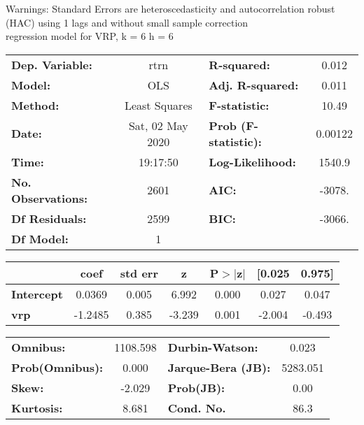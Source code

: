 Warnings: \newline
 [1] Standard Errors are heteroscedasticity and autocorrelation robust (HAC) using 1 lags and without small sample correction\\ 

regression model for VRP, k = 6 h = 6\begin{center}
\begin{tabular}{lclc}
\toprule
\textbf{Dep. Variable:}    &       rtrn       & \textbf{  R-squared:         } &     0.012   \\
\textbf{Model:}            &       OLS        & \textbf{  Adj. R-squared:    } &     0.011   \\
\textbf{Method:}           &  Least Squares   & \textbf{  F-statistic:       } &     10.49   \\
\textbf{Date:}             & Sat, 02 May 2020 & \textbf{  Prob (F-statistic):} &  0.00122    \\
\textbf{Time:}             &     19:17:50     & \textbf{  Log-Likelihood:    } &    1540.9   \\
\textbf{No. Observations:} &        2601      & \textbf{  AIC:               } &    -3078.   \\
\textbf{Df Residuals:}     &        2599      & \textbf{  BIC:               } &    -3066.   \\
\textbf{Df Model:}         &           1      & \textbf{                     } &             \\
\bottomrule
\end{tabular}
\begin{tabular}{lcccccc}
                   & \textbf{coef} & \textbf{std err} & \textbf{z} & \textbf{P$> |$z$|$} & \textbf{[0.025} & \textbf{0.975]}  \\
\midrule
\textbf{Intercept} &       0.0369  &        0.005     &     6.992  &         0.000        &        0.027    &        0.047     \\
\textbf{vrp}       &      -1.2485  &        0.385     &    -3.239  &         0.001        &       -2.004    &       -0.493     \\
\bottomrule
\end{tabular}
\begin{tabular}{lclc}
\textbf{Omnibus:}       & 1108.598 & \textbf{  Durbin-Watson:     } &    0.023  \\
\textbf{Prob(Omnibus):} &   0.000  & \textbf{  Jarque-Bera (JB):  } & 5283.051  \\
\textbf{Skew:}          &  -2.029  & \textbf{  Prob(JB):          } &     0.00  \\
\textbf{Kurtosis:}      &   8.681  & \textbf{  Cond. No.          } &     86.3  \\
\bottomrule
\end{tabular}
\end{center}

